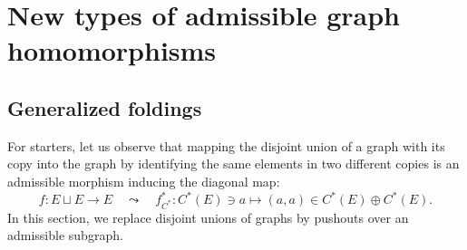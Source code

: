 \documentclass[12pt,times,a4paper]{amsart}
\numberwithin{equation}{section}
\numberwithin{equation}{section}
\begin{document}
\section{New types of admissible graph homomorphisms}
\noindent

\subsection{Generalized foldings}
For starters, let us observe that mapping the
disjoint union of a graph with its copy into the graph by identifying the same elements in two different copies is
 an admissible morphism 
inducing the diagonal map:
\begin{equation}\label{diagonal}
f\colon E\sqcup E \longrightarrow E \quad\leadsto\quad f^*_{C^*}\colon C^*(E)\ni a\longmapsto (a,a) \in C^*(E)\oplus C^*(E).
\end{equation}
In this section, we replace  disjoint unions of graphs by pushouts over an admissible subgraph. 
\end{document}
